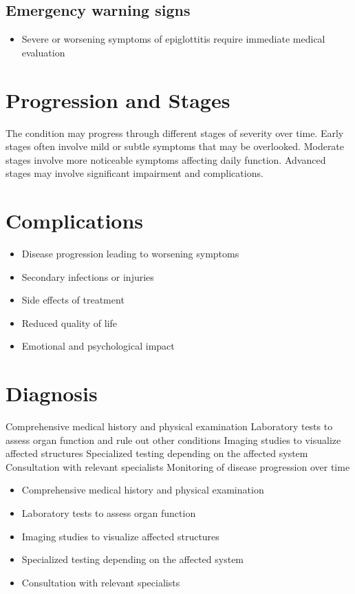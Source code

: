 \subsection{Emergency warning signs}
\begin{itemize}[noitemsep]
  \item Severe or worsening symptoms of epiglottitis require immediate medical evaluation
\end{itemize}
\section{Progression and Stages}
The condition may progress through different stages of severity over time. Early stages often involve mild or subtle symptoms that may be overlooked. Moderate stages involve more noticeable symptoms affecting daily function. Advanced stages may involve significant impairment and complications.
\section{Complications}
\begin{itemize}[noitemsep]
  \item Disease progression leading to worsening symptoms
  \item Secondary infections or injuries
  \item Side effects of treatment
  \item Reduced quality of life
  \item Emotional and psychological impact
\end{itemize}
\section{Diagnosis}
Comprehensive medical history and physical examination Laboratory tests to assess organ function and rule out other conditions Imaging studies to visualize affected structures Specialized testing depending on the affected system Consultation with relevant specialists Monitoring of disease progression over time

\begin{itemize}[noitemsep]
  \item Comprehensive medical history and physical examination
  \item Laboratory tests to assess organ function
  \item Imaging studies to visualize affected structures
  \item Specialized testing depending on the affected system
  \item Consultation with relevant specialists
\end{itemize}
